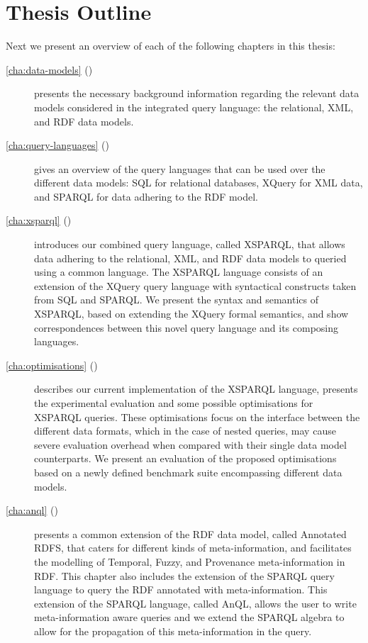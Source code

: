 \section{Thesis Outline}
\label{sec:outline}

Next we present an overview of each of the following chapters in this thesis:
%
\begin{description}

\item[\cref{cha:data-models} ()] presents the necessary background information regarding the
  relevant data models considered in the integrated query language: the relational, \ac{XML}, and \ac{RDF} data models.

\item[\cref{cha:query-languages} ()] gives an overview of the query languages that can be
  used over the different data models: SQL for relational databases, XQuery for \ac{XML} data, and SPARQL for data
  adhering to the \ac{RDF} model.

\item[\cref{cha:xsparql} ()] introduces our combined query language, called XSPARQL, that allows
  data adhering to the relational, \ac{XML}, and \ac{RDF} data models to queried using a common language.  The XSPARQL
  language consists of an extension of the XQuery query language with syntactical constructs taken from \ac{SQL} and
  SPARQL.  We present the syntax and semantics of XSPARQL, based on extending the XQuery formal semantics, and show
  correspondences between this novel query language and its composing languages.

\item[\cref{cha:optimisations} ()] describes our current implementation of the XSPARQL
  language, presents the experimental evaluation and some possible optimisations for XSPARQL queries.  These
  optimisations focus on the interface between the different data formats, which in the case of nested queries, may
  cause severe evaluation overhead when compared with their single data model counterparts.  We present an evaluation of
  the proposed optimisations based on a newly defined benchmark suite encompassing different data models.

\item[\cref{cha:anql} ()] presents a common extension of the \ac{RDF} data model, called Annotated
  RDFS, that caters for different kinds of meta-information, and facilitates the modelling of Temporal, Fuzzy, and
  Provenance meta-information in \ac{RDF}.
  This chapter also includes the extension of the SPARQL query language to query the \ac{RDF} annotated with
  meta-information.  This extension of the SPARQL language, called AnQL, allows the user to write meta-information aware
  queries and we extend the SPARQL algebra to allow for the propagation of this meta-information in the query.


\end{description}
